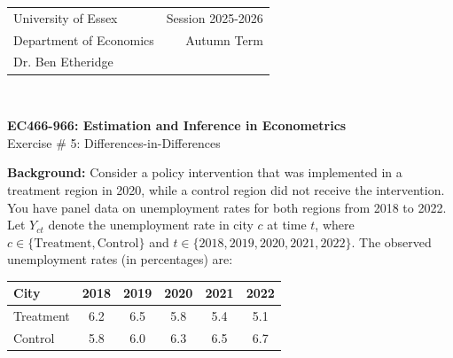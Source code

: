 \documentclass[12pt,a4paper]{article}
\begin{document}
\begin{tabular}{l r}
University of Essex  \hspace{35ex}& Session 2025-2026 \\
Department of Economics \hspace{35ex} & Autumn Term\\
Dr. Ben Etheridge \hspace{35ex} &
\end{tabular}
\\
\begin{center}
\large{\textbf{EC466-966: Estimation and Inference in Econometrics }\\
Exercise \# 5: Differences-in-Differences}
\end{center}
\vspace*{0.5cm}

\textbf{Background:} Consider a policy intervention that was implemented in a treatment region in 2020, while a control region did not receive the intervention. You have panel data on unemployment rates for both regions from 2018 to 2022.\\

Let $Y_{ct}$ denote the unemployment rate in city $c$ at time $t$, where $c \in \{\text{Treatment}, \text{Control}\}$ and $t \in \{2018, 2019, 2020, 2021, 2022\}$. The observed unemployment rates (in percentages) are:

\vspace{1em}
\begin{center}
\begin{tabular}{lccccc}
\hline
City & 2018 & 2019 & 2020 & 2021 & 2022 \\
\hline
Treatment & 6.2 & 6.5 & 5.8 & 5.4 & 5.1 \\
Control & 5.8 & 6.0 & 6.3 & 6.5 & 6.7 \\
\hline
\end{tabular}
\end{center}
\vspace{1em}
\end{document}
